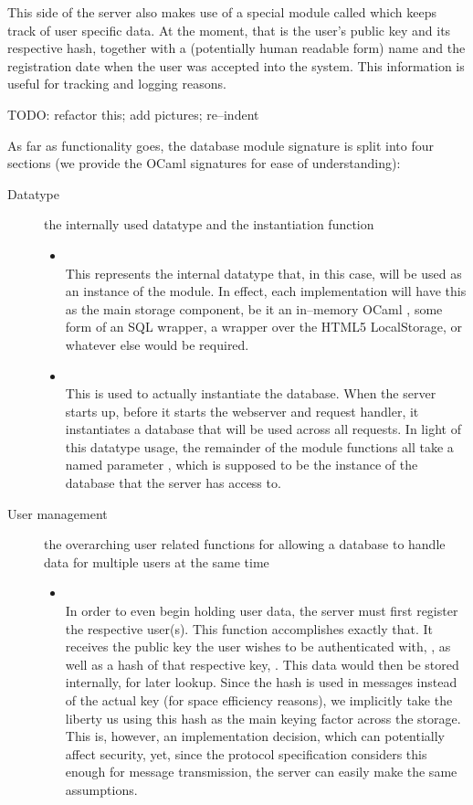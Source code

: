 This side of the server also makes use of a special module called  which keeps track of user specific data.
At the moment, that is the user's public key and its respective hash, together with a (potentially human readable form) name and the registration date when the user was accepted into the system.
This information is useful for tracking and logging reasons.

TODO: refactor this; add pictures; re--indent

As far as functionality goes, the database module signature is split into four sections (we provide the OCaml signatures for ease of understanding):
\begin{description}
  \item[Datatype] the internally used datatype and the instantiation function
  \begin{itemize}
    \item {} \\
    This represents the internal datatype that, in this case, will be used as an instance of the module.
    In effect, each implementation will have this as the main storage component, be it an in--memory OCaml , some form of an SQL wrapper, a wrapper over the HTML5 LocalStorage, or whatever else would be required.
    \item {} \\
    This is used to actually instantiate the database.
    When the server starts up, before it starts the webserver and request handler, it instantiates a database that will be used across all requests.
    In light of this datatype usage, the remainder of the module functions all take a named parameter , which is supposed to be the instance of the database that the server has access to.
  \end{itemize}

  \item[User management] the overarching user related functions for allowing a database to handle data for multiple users at the same time
  \begin{itemize}
  \item {} \\
  In order to even begin holding user data, the server must first register the respective user(s).
  This function accomplishes exactly that.
  It receives the public key the user wishes to be authenticated with, , as well as a hash of that respective key, .
  This data would then be stored internally, for later lookup.
  Since the hash is used in messages instead of the actual key (for space efficiency reasons), we implicitly take the liberty us using this hash as the main keying factor across the storage.
  This is, however, an implementation decision, which can potentially affect security, yet, since the protocol specification considers this enough for message transmission, the server can easily make the same assumptions.


\end{itemize}
\end{description}
